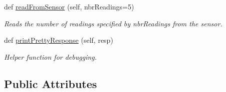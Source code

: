 \begin{DoxyCompactItemize}
def \mbox{\hyperlink{classsensor_app_1_1_sensor_app_a5c008ad5e7412c3e6edb19fd1853c882}{read\+From\+Sensor}} (self, nbr\+Readings=5)
\begin{DoxyCompactList}\small\item\em Reads the number of readings specified by nbr\+Readings from the sensor. \end{DoxyCompactList}\item 
def \mbox{\hyperlink{classsensor_app_1_1_sensor_app_ac51bf775c9b2e7e176a3535127036e69}{print\+Pretty\+Response}} (self, resp)
\begin{DoxyCompactList}\small\item\em Helper function for debugging. \end{DoxyCompactList}\end{DoxyCompactItemize}
\subsection*{Public Attributes}

